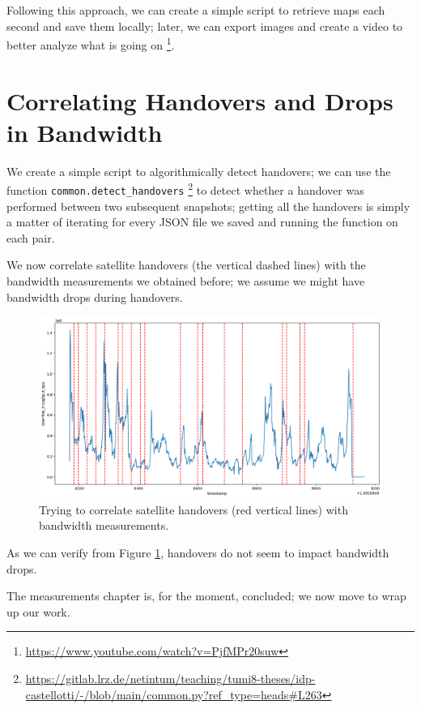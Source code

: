 \documentclass[IN,11pt,twoside,openright,idp,english]{tumthesis}
\begin{document}
Following this approach, we can create a simple script to retrieve maps each second and save them locally; later, we can export images and create a video to better analyze what is going on \footnote{\url{https://www.youtube.com/watch?v=PjfMPr20suw}}.

\section{Correlating Handovers and Drops in Bandwidth}
\label{sec:sat-hand-drop}

We create a simple script to algorithmically detect handovers; we can use the function \texttt{common.detect\_handovers} \footnote{\url{https://gitlab.lrz.de/netintum/teaching/tumi8-theses/idp-castellotti/-/blob/main/common.py?ref_type=heads\#L263}} to detect whether a handover was performed between two subsequent snapshots; getting all the handovers is simply a matter of iterating for every JSON file we saved and running the function on each pair.

We now correlate satellite handovers (the vertical dashed lines) with the bandwidth measurements we obtained before; we assume we might have bandwidth drops during handovers. 

\begin{figure}
    \centering
    \includegraphics[width=1\columnwidth]{img/correlation_handovers_bw.png}
    \caption{Trying to correlate satellite handovers (red vertical lines) with bandwidth measurements.}
    \label{fig:vis-correlation-handovers}
\end{figure}

As we can verify from Figure \ref{fig:vis-correlation-handovers}, handovers do not seem to impact bandwidth drops.

The measurements chapter is, for the moment, concluded; we now move to wrap up our work.
\end{document}

